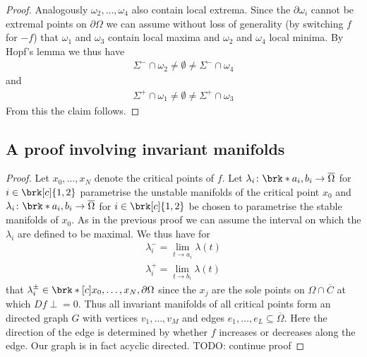\begin{proof}
  Analogously $\omega_2,\dots,\omega_4$ also contain local extrema. Since the $\partial\omega_i$ cannot be extremal points on $\partial\Omega$
  we can assume without loss of generality (by switching $f$ for $-f$) that $\omega_1$ and $\omega_3$ contain local maxima and $\omega_2 $ and $\omega_4$ local
  minima. By Hopf's lemma we thus have
  \begin{align*}
    \Sigma^-\cap\omega_2\neq\emptyset\neq\Sigma^-\cap\omega_4
  \end{align*}
  and 
  \begin{align*}
    \Sigma^+\cap\omega_1\neq\emptyset\neq\Sigma^+\cap\omega_3
  \end{align*}
  From this the claim follows.
\end{proof}

\subsection*{A proof involving invariant manifolds}
\begin{proof}
  Let $x_0,\dots,x_N$ denote the critical points of $f$. Let $\lambda_i\colon\brk*{a_i,b_i}\to\overline{\Omega}$ for $i\in\brk[c]{1,2}$ parametrise the unstable manifolds of the
  critical point $x_0$ and
  $\lambda_i\colon\brk*{a_i,b_i}\to\overline{\Omega}$ for $i\in\brk[c]{1,2}$ be chosen to parametrise the stable manifolds of $x_0$.
  As in the previous proof we can assume the interval on which the $\lambda_i$ are defined to be maximal. We thus have for
  \begin{align*}
    \lambda_i^-=\lim_{t\to a_i}\lambda(t) \\
    \lambda_i^+=\lim_{t\to b_i}\lambda(t)
  \end{align*}
  that $\lambda_i^\pm\in\brk*[c]{x_0,\dots,x_N,\partial\Omega}$ since the $x_j$ are the sole points on $\Omega\cap\overline{C}$
  at which $Df\perp=0$. Thus all invariant manifolds of all critical points form an directed graph $G$ with vertices $v_1,\dots,v_M$ and 
  edges $e_1,\dots,e_L\subseteq\overline{\Omega}$. Here the direction of the edge is determined by whether $f$ increases or decreases
  along the edge. Our graph is in fact acyclic directed.
  TODO: continue proof
\end{proof}  

\newpage

